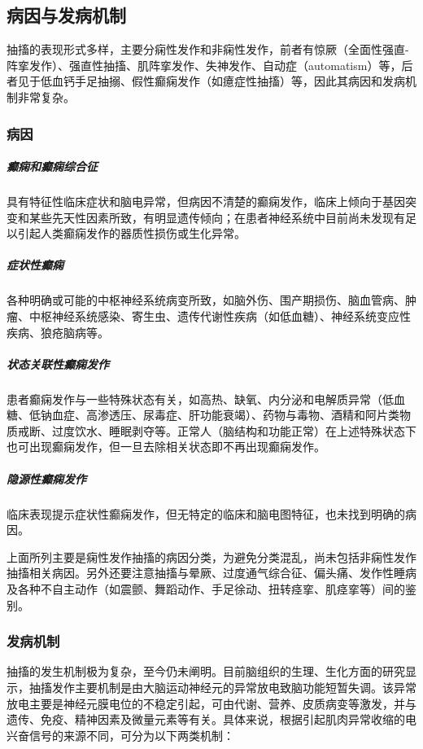 \subsection{病因与发病机制}

抽搐的表现形式多样，主要分痫性发作和非痫性发作，前者有惊厥（全面性强直-阵挛发作）、强直性抽搐、肌阵挛发作、失神发作、自动症（automatism）等，后者见于低血钙手足抽搦、假性癫痫发作（如癔症性抽搐）等，因此其病因和发病机制非常复杂。

\subsubsection{病因}

\subparagraph{癫痫和癫痫综合征}

具有特征性临床症状和脑电异常，但病因不清楚的癫痫发作，临床上倾向于基因突变和某些先天性因素所致，有明显遗传倾向；在患者神经系统中目前尚未发现有足以引起人类癫痫发作的器质性损伤或生化异常。

\subparagraph{症状性癫痫}

各种明确或可能的中枢神经系统病变所致，如脑外伤、围产期损伤、脑血管病、肿瘤、中枢神经系统感染、寄生虫、遗传代谢性疾病（如低血糖）、神经系统变应性疾病、狼疮脑病等。

\subparagraph{状态关联性癫痫发作}

患者癫痫发作与一些特殊状态有关，如高热、缺氧、内分泌和电解质异常（低血糖、低钠血症、高渗透压、尿毒症、肝功能衰竭）、药物与毒物、酒精和阿片类物质戒断、过度饮水、睡眠剥夺等。正常人（脑结构和功能正常）在上述特殊状态下也可出现癫痫发作，但一旦去除相关状态即不再出现癫痫发作。

\subparagraph{隐源性癫痫发作}

临床表现提示症状性癫痫发作，但无特定的临床和脑电图特征，也未找到明确的病因。

上面所列主要是痫性发作抽搐的病因分类，为避免分类混乱，尚未包括非痫性发作抽搐相关病因。另外还要注意抽搐与晕厥、过度通气综合征、偏头痛、发作性睡病及各种不自主动作（如震颤、舞蹈动作、手足徐动、扭转痉挛、肌痉挛等）间的鉴别。

\subsubsection{发病机制}

抽搐的发生机制极为复杂，至今仍未阐明。目前脑组织的生理、生化方面的研究显示，抽搐发作主要机制是由大脑运动神经元的异常放电致脑功能短暂失调。该异常放电主要是神经元膜电位的不稳定引起，可由代谢、营养、皮质病变等激发，并与遗传、免疫、精神因素及微量元素等有关。具体来说，根据引起肌肉异常收缩的电兴奋信号的来源不同，可分为以下两类机制：

